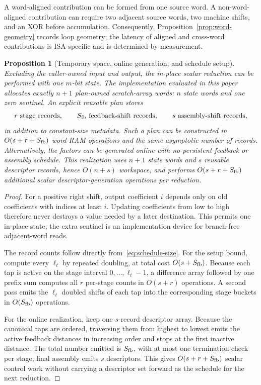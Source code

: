 \documentclass{mcom-l}
\numberwithin{equation}{section}
\newtheorem{proposition}[theorem]{Proposition}
\theoremstyle{definition}
\theoremstyle{remark}
\begin{document}
A word-aligned contribution can be formed from one source word.  A
non-word-aligned contribution can require two adjacent source words, two
machine shifts, and an XOR before accumulation.  Consequently,
Proposition~\ref{prop:word-geometry} records loop geometry; the latency of
aligned and cross-word contributions is ISA-specific and is determined by
measurement.

\begin{proposition}[Temporary space, online generation, and schedule setup]
\label{prop:space-setup}
Excluding the caller-owned input and output, the in-place scalar reduction
can be performed with one $m$-bit state.  The implementation evaluated in
this paper allocates exactly $n+1$ plan-owned scratch-array words: $n$ state
words and one zero sentinel.  An
explicit reusable plan stores
\[
  r\ \text{stage records},\qquad
  S_{\rm fb}\ \text{feedback-shift records},\qquad
  s\ \text{assembly-shift records},
\]
in addition to constant-size metadata.  Such a plan can be constructed in
$O(s+r+S_{\rm fb})$ word-RAM operations and the same asymptotic number of
records.  Alternatively, the factors can be generated online with no
persistent feedback or assembly schedule.  This realization uses $n+1$ state words and
$s$ reusable descriptor records, hence $O(n+s)$ workspace, and performs
$O(s+r+S_{\rm fb})$ additional scalar descriptor-generation operations per
reduction.
\end{proposition}
\begin{proof}
For a positive right shift, output coefficient $i$ depends only on old
coefficients with indices at least $i$.  Updating coefficients from low to
high therefore never destroys a value needed by a later destination.  This
permits one in-place state; the extra sentinel is an implementation device for
branch-free adjacent-word reads.

The record counts follow directly from~\eqref{eq:schedule-size}.  For the
setup bound, compute every $\ell_t$ by repeated doubling, at total cost
$O(s+S_{\rm fb})$.  Because each tap is active on the stage interval
$0,\ldots,\ell_t-1$, a difference array followed by one prefix sum computes
all $r$ per-stage counts in $O(s+r)$ operations.  A second pass emits the
$\ell_t$ doubled shifts of each tap into the corresponding stage buckets in
$O(S_{\rm fb})$ operations.

For the online realization, keep one $s$-record descriptor array.  Because
the canonical taps are ordered, traversing them from highest to lowest emits
the active feedback distances in increasing order and stops at the first
inactive distance.  The total number emitted is $S_{\rm fb}$, with at most one
termination check per stage; final assembly emits $s$ descriptors.  This gives
$O(s+r+S_{\rm fb})$ scalar control work without carrying a descriptor set
forward as the schedule for the next reduction.
\end{proof}
\end{document}

